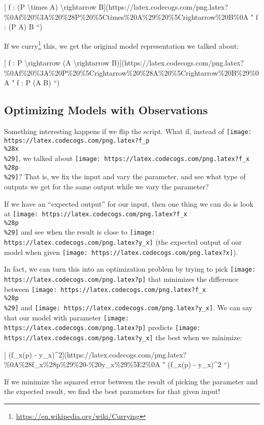 \documentclass[]{article}
\renewcommand{\href}[2]{#2\footnote{\url{#1}}}
\begin{document}
{[} f : (P \textbackslash{}times A) \textbackslash{}rightarrow
B{]}(https://latex.codecogs.com/png.latex?\%0Af\%20\%3A\%20\%28P\%20\%5Ctimes\%20A\%29\%20\%5Crightarrow\%20B\%0A
" f : (P \times A) \rightarrow B ``)

If we \href{https://en.wikipedia.org/wiki/Currying}{curry} this, we get the
original model representation we talked about:

{[} f : P \textbackslash{}rightarrow (A \textbackslash{}rightarrow
B){]}(https://latex.codecogs.com/png.latex?\%0Af\%20\%3A\%20P\%20\%5Crightarrow\%20\%28A\%20\%5Crightarrow\%20B\%29\%0A
" f : P \rightarrow (A \rightarrow B) ``)

\hypertarget{optimizing-models-with-observations}{%
\subsection{Optimizing Models with
Observations}\label{optimizing-models-with-observations}}

Something interesting happens if we flip the script. What if, instead of
\texttt{[image: https://latex.codecogs.com/png.latex?f\_p\\\%28x\\\%29]}, we talked
about \texttt{[image: https://latex.codecogs.com/png.latex?f\_x\\\%28p\\\%29]}? That
is, we fix the input and vary the parameter, and see what type of outputs we get
for the same output while we vary the parameter?

If we have an ``expected output'' for our input, then one thing we can do is
look at \texttt{[image: https://latex.codecogs.com/png.latex?f\_x\\\%28p\\\%29]} and
see when the result is close to
\texttt{[image: https://latex.codecogs.com/png.latex?y\_x]} (the expected output
of our model when given
\texttt{[image: https://latex.codecogs.com/png.latex?x]}).

In fact, we can turn this into an optimization problem by trying to pick
\texttt{[image: https://latex.codecogs.com/png.latex?p]} that minimizes the
difference between
\texttt{[image: https://latex.codecogs.com/png.latex?f\_x\\\%28p\\\%29]} and
\texttt{[image: https://latex.codecogs.com/png.latex?y\_x]}. We can say that our
model with parameter \texttt{[image: https://latex.codecogs.com/png.latex?p]}
predicts \texttt{[image: https://latex.codecogs.com/png.latex?y\_x]} the best
when we minimize:

{[} (f\_x(p) -
y\_x)\^{}2{]}(https://latex.codecogs.com/png.latex?\%0A\%28f\_x\%28p\%29\%20-\%20y\_x\%29\%5E2\%0A
" (f\_x(p) - y\_x)\^{}2 ``)

If we minimize the squared error between the result of picking the parameter and
the expected result, we find the best parameters for that given input!
\end{document}
